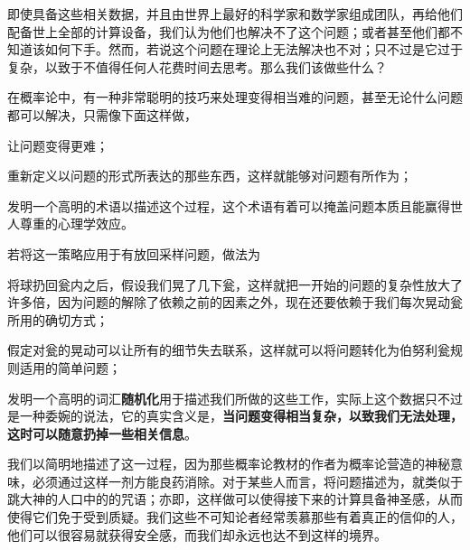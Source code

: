 即使具备这些相关数据，并且由世界上最好的科学家和数学家组成团队，再给他们配备世上全部的计算设备，我们认为他们也解决不了这个问题；或者甚至他们都不知道该如何下手。然而，若说这个问题在理论上无法解决也不对；只不过是它过于复杂，以致于不值得任何人花费时间去思考。那么我们该做些什么？

在概率论中，有一种非常聪明的技巧来处理变得相当难的问题，甚至无论什么问题都可以解决，只需像下面这样做，

\startsmallitemize[n]
\item 让问题变得更难；
\item 重新定义以问题的形式所表达的那些东西，这样就能够对问题有所作为；
\item 发明一个高明的术语以描述这个过程，这个术语有着可以掩盖问题本质且能赢得世人尊重的心理学效应。
\stopsmallitemize

若将这一策略应用于有放回采样问题，做法为

\startsmallitemize[n]
\item 将球扔回瓮内之后，假设我们晃了几下瓮，这样就把一开始的问题的复杂性放大了许多倍，因为问题的解除了依赖之前的因素之外，现在还要依赖于我们每次晃动瓮所用的确切方式；
\item 假定对瓮的晃动可以让所有的细节失去联系，这样就可以将问题转化为伯努利瓮规则适用的简单问题；
\item 发明一个高明的词汇{\bf 随机化}用于描述我们所做的这些工作，实际上这个数据只不过是一种委婉的说法，它的真实含义是，{\bf 当问题变得相当复杂，以致我们无法处理，这时可以随意扔掉一些相关信息}。
\stopsmallitemize

我们以简明地描述了这一过程，因为那些概率论教材的作者为概率论营造的神秘意味，必须通过这样一剂方能良药消除。对于某些人而言，将问题描述为，就类似于跳大神的人口中的的咒语；亦即，这样做可以使得接下来的计算具备神圣感，从而使得它们免于受到质疑。我们这些不可知论者经常羡慕那些有着真正的信仰的人，他们可以很容易就获得安全感，而我们却永远也达不到这样的境界。

